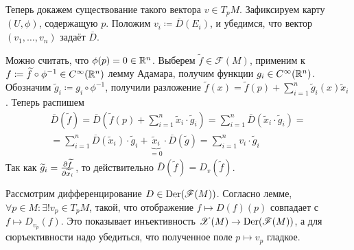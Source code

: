 \documentclass[a4paper]{report}
\begin{document}
{{{        Теперь докажем существование такого вектора $v \in T_p M$.
         Зафиксируем карту $(U, \phi)$, содержащую $p$.
         Положим $v_i \coloneqq \overline D(E_i)$, и убедимся, что вектор $(v_1, \dots, v_n)$ задаёт $\overline{D}$.
%




         Можно считать, что $\phi(p) = 0 \in \mathbb{R}^n$.
         Выберем $\tilde{f} \in \mathscr{F}(M)$, применим к $f \coloneqq \widetilde{f} \circ \phi^{-1} \in C^{\infty}(\mathbb{R}^n)$ лемму Адамара, получим функции $g_i \in C^{\infty}(\mathbb{R}^n)$.
         Обозначим $\tilde{g}_i \coloneqq g_i \circ \phi^{-1}$, получили разложение $\tilde{f}(x) = \tilde{f}(p) + \sum\limits_{i = 1}^{n}\tilde{g}_i(x)\tilde{x}_i$.
         Теперь распишем \begin{multline*}\overline{D}\left(\tilde{f}\right) = \overline{D}\left(\tilde{f}(p) + \sum\limits_{i=1}^{n}\tilde{x}_i \cdot \tilde{g}_i\right) = \sum\limits_{i=1}^{n}\overline{D}\left(\tilde{x}_i \cdot \tilde{g}_i\right) =\\= \sum\limits_{i=1}^{n}\overline{D}\left(\tilde{x}_i\right) \cdot \tilde{g}_i + \underbrace{\tilde{x}_i}_{=0} \cdot \overline{D}\left(\tilde{g}\right) = \sum\limits_{i = 1}^{n} v_i \cdot \tilde{g}_i\end{multline*}
         Так как $\widetilde g_i = \frac{\partial \widetilde f}{\partial \widetilde x_i}$, то действительно $\overline{D}(\tilde{f}) = D_v(\tilde{f})$.
        }
    Рассмотрим дифференцирование $D \in \operatorname{Der}(\mathscr{F}(M))$.
        Согласно лемме, $\forall p \in M: \exists !v_p \in T_p M$, такой, что отображение $f \mapsto D(f)(p)$ совпадает с $f \mapsto D_{v_p}(f)$.
    Это показывает инъективность $\mathscr{X}(M) \rightarrow \operatorname{Der}(\mathscr{F}(M))$, а для сюръективности надо убедиться, что полученное поле $p \mapsto v_p$ гладкое.

}}
\end{document}
